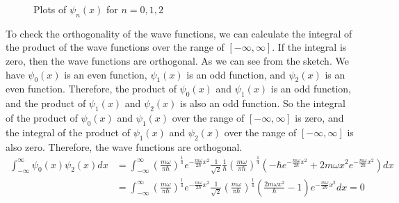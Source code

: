 \documentclass{article}
\begin{document}
\begin{figure}[H]
	\centering
	\caption{Plots of \(\psi_n(x)\) for \(n=0, 1, 2\)}
\end{figure}


\noindent To check the orthogonality of the wave functions, we can calculate the integral of the product of the wave functions over the range of \([- \infty, \infty]\). If the integral is zero, then the wave functions are orthogonal. As we can see from the sketch. We have \(\psi_0(x)\) is an even function, \(\psi_1(x)\) is an odd function, and \(\psi_2(x)\) is an even function. Therefore, the product of \(\psi_0(x)\) and \(\psi_1(x)\) is an odd function, and the product of \(\psi_1(x)\) and \(\psi_2(x)\) is also an odd function.
So the integral of the product of \(\psi_0(x)\) and \(\psi_1(x)\) over the range of \([- \infty, \infty]\) is zero, and the integral of the product of \(\psi_1(x)\) and \(\psi_2(x)\) over the range of \([- \infty, \infty]\) is also zero. Therefore, the wave functions are orthogonal.
\begin{align*}
	\int_{-\infty}^{\infty} \psi_0(x) \psi_2(x) dx & = \int_{-\infty}^{\infty} \left(\frac{m \omega}{\pi \hbar}\right)^{\frac{1}{4}} e^{-\frac{m \omega}{2\hbar}x^2} \frac{1}{\sqrt{2}} \frac{1}{\hbar} \left(\frac{m \omega}{\pi \hbar}\right)^{\frac{1}{4}} \left(-\hbar e^{-\frac{m \omega}{2\hbar}x^2} + 2 m \omega x^2 e^{-\frac{m \omega}{2\hbar}x^2}\right) dx \\
	                                               & = \int_{-\infty}^{\infty} \left(\frac{m \omega}{\pi \hbar}\right)^{\frac{1}{4}} e^{-\frac{m \omega}{2\hbar}x^2} \frac{1}{\sqrt{2}} \left(\frac{m \omega}{\pi \hbar}\right)^{\frac{1}{4}} \left(\frac{2 m \omega x^2}{\hbar} -1 \right) e^{-\frac{m \omega}{2\hbar}x^2} dx = 0                                    \\
\end{align*}
\end{document}
